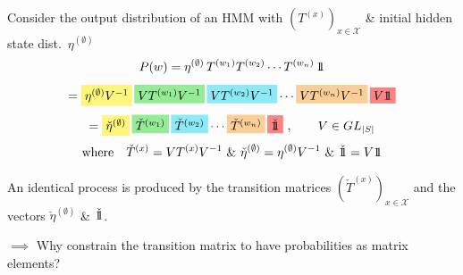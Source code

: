 \documentclass[aspectratio=169,11pt]{beamer}
\newcommand{\py}[1]{\colorbox{hly}{\ensuremath{#1}}}
\newcommand{\pg}[1]{\colorbox{hlg}{\ensuremath{#1}}}
\newcommand{\pc}[1]{\colorbox{hlc}{\ensuremath{#1}}}
\newcommand{\po}[1]{\colorbox{hlo}{\ensuremath{#1}}}
\newcommand{\pr}[1]{\colorbox{hlr}{\ensuremath{#1}}}
\newcommand{\ones}{\ensuremath{\mathrm{1}\mkern-6mu\mathrm{1}}}
\begin{document}
\begin{frame}
  \vspace{0.4em}
  Consider the output distribution of an HMM with
  $(T^{(x)})_{x\in\mathcal{X}}$ \& initial hidden state dist.\
  $\eta^{(\emptyset)}$
  \[
    P(w) = \eta^{(\emptyset)}\,T^{(w_1)}T^{(w_2)}\cdots T^{(w_n)}\,\ones
  \]
  \vspace{-1.0em}
  \[
    = \py{\eta^{(\emptyset)}V^{-1}}\,
      \pg{V T^{(w_1)} V^{-1}}\,
      \pc{V T^{(w_2)} V^{-1}} \cdots
      \po{V T^{(w_n)} V^{-1}}\,
      \pr{V\ones}
  \]
  \vspace{-1.0em}
  \[
    = \py{\check{\eta}^{(\emptyset)}}\,
      \pg{\check{T}^{(w_1)}}\,
      \pc{\check{T}^{(w_2)}} \cdots
      \po{\check{T}^{(w_n)}}\,
      \pr{\check{\ones}}\ ,
    \qquad V \in GL_{|S|}
  \]
  \vspace{-0.6em}
  \[
    \text{where}\quad
    \check{T}^{(x)} = V T^{(x)} V^{-1}
    \ \&\
    \check{\eta}^{(\emptyset)} = \eta^{(\emptyset)}V^{-1}
    \ \&\
    \check{\ones} = V\ones
  \]
  \vspace{-0.4em}

  An identical process is produced by the transition matrices
  $(\check{T}^{(x)})_{x\in\mathcal{X}}$ and the vectors
  $\check{\eta}^{(\emptyset)}$ \& $\check{\ones}$.
  \vspace{0.3em}

  $\implies$ Why constrain the transition matrix to have probabilities as
  matrix elements?
\end{frame}
\end{document}
